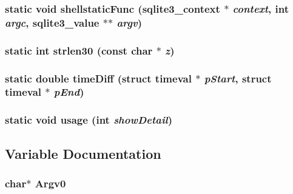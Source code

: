 \subsubsection{\setlength{\rightskip}{0pt plus 5cm}static void shellstatic\-Func (\bf{sqlite3\_\-context} $\ast$ {\em context}, int {\em argc}, \bf{sqlite3\_\-value} $\ast$$\ast$ {\em argv})\hspace{0.3cm}{\tt  [static]}}\label{shell_8c_5635c981f0122ed8f2ec8952a49bc50e}


\subsubsection{\setlength{\rightskip}{0pt plus 5cm}static int strlen30 (const char $\ast$ {\em z})\hspace{0.3cm}{\tt  [static]}}\label{shell_8c_fe20d941e9f763d4f93284ce0807c26a}


\subsubsection{\setlength{\rightskip}{0pt plus 5cm}static double time\-Diff (struct timeval $\ast$ {\em p\-Start}, struct timeval $\ast$ {\em p\-End})\hspace{0.3cm}{\tt  [static]}}\label{shell_8c_3e5e4a10de57c40c4d2e0bae4887ec37}


\subsubsection{\setlength{\rightskip}{0pt plus 5cm}static void usage (int {\em show\-Detail})\hspace{0.3cm}{\tt  [static]}}\label{shell_8c_506ec868e8dd410fb9cd2f0368943003}




\subsection{Variable Documentation}
\subsubsection{\setlength{\rightskip}{0pt plus 5cm}char$\ast$ \bf{Argv0}\hspace{0.3cm}{\tt  [static]}}\label{shell_8c_d2ce19cdb60d033ab72f85f676ddfe6d}



